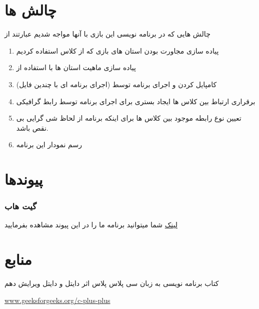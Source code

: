\documentclass[pdf,titlepage,a4paper]{report}
\begin{document}
	\newpage
	
	
	
	\part{چالش ها}
	
	چالش هایی که در برنامه نویسی این بازی با آنها مواجه شدیم عبارتند از 
	\begin{enumerate}
		\item	پیاده سازی مجاورت بودن استان های بازی که از کلاس   استفاده کردیم 
		\item پیاده سازی ماهیت استان ها با استفاده از  
		\item کامپایل کردن و اجرای برنامه توسط  (اجرای برنامه ای با چندین فایل)
    	\item برقراری ارتباط بین کلاس ها  ایجاد بستری برای اجرای برنامه توسط رابط گرافیکی 
	    \item تعیین نوع رابطه موجود بین کلاس ها برای اینکه برنامه از لحاظ شی گرایی بی نقص باشد.
		\item رسم نمودار این برنامه
	\end{enumerate}

	\newpage
		
	\part{پیوندها}
	\section{گیت هاب}
	\href{https://github.com/Matin0789/Condottiere-.git}{لینک}
     شما میتوانید برنامه ما را در این پیوند مشاهده بفرمایید 
	\newpage
	
	
	
	\part{منابع}
	\begin{itemize}
		\item کتاب برنامه نویسی به زبان سی پلاس پلاس اثر دایتل و دایتل ویرایش دهم\\
	\begin{latin}
		\item \href{https://www.geeksforgeeks.org/c-plus-plus/}{www.geeksforgeeks.org/c-plus-plus}
	\end{latin}
	\end{itemize}
	
	
\end{document}

